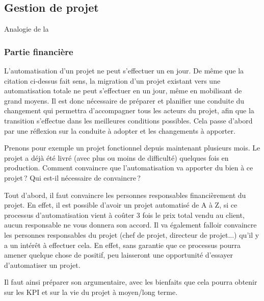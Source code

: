 \subsection{Gestion de projet}

\epigraph{}{Analogie de la }

\subsubsection{Partie financière}
L'automatisation d'un projet ne peut s'effectuer un en jour. De même que la citation ci-dessus fait sens, la migration d'un projet existant vers une automatisation totale ne peut s'effectuer en un jour, même en mobilisant de grand moyens. Il est donc nécessaire de préparer et planifier une conduite du changement qui permettra d'accompagner tous les acteurs du projet, afin que la transition s'effectue dans les meilleures conditions possibles. Cela passe d'abord par une réflexion sur la conduite à adopter et les changements à apporter. 

Prenons pour exemple un projet fonctionnel depuis maintenant plusieurs mois. Le projet a déjà été livré (avec plus ou moins de difficulté) quelques fois en production. Comment convaincre que l'automatisation va apporter du bien à ce projet ? Qui est-il nécessaire de convaincre ?

Tout d'abord, il faut convaincre les personnes responsables financièrement du projet. En effet, il est possible d'avoir un projet automatisé de A à Z, si ce processus d'automatisation vient à coûter 3 fois le prix total vendu au client, aucun responsable ne vous donnera son accord. Il va également falloir convaincre les personnes responsables du projet (chef de projet, directeur de projet...) qu'il y a un intérêt à effectuer cela. En effet, sans garantie que ce processus pourra amener quelque chose de positif, peu laisseront une opportunité d'essayer d'automatiser un projet.

Il faut ainsi préparer son argumentaire, avec les bienfaits que cela pourra obtenir sur les \gls{KPI} et sur la vie du projet à moyen/long terme.

